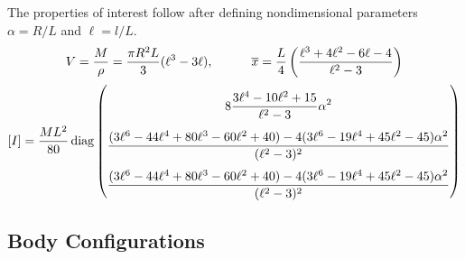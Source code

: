 \documentclass[11pt,dvipsnames]{thesis}
\begin{document}
The properties of interest follow after defining nondimensional parameters $\alpha = R/L$ and $\ell = l/L$.
\begin{gather}
V = \frac{M}{\rho} = \frac{\pi R^2 L}{3} (\ell^3 - 3\ell), \qquad\quad \overline{x} = \frac{L}{4} \left(\frac{\ell^3 + 4\ell^2 -6\ell - 4}{\ell^2 - 3}\right) \\
[I] = \frac{M L^2}{80} \operatorname{diag}
\renewcommand\arraystretch{2.6}
\begin{pmatrix}
\displaystyle 8 \frac{3\ell^4 - 10\ell^2 + 15}{\ell^2 - 3} \alpha^2 \\
\displaystyle \frac{(3\ell^6 - 44\ell^4 + 80\ell^3 - 60\ell^2 + 40) - 4(3\ell^6 - 19\ell^4 + 45\ell^2 - 45)\alpha^2}{(\ell^2 - 3)^2} \\ 
\displaystyle \frac{(3\ell^6 - 44\ell^4 + 80\ell^3 - 60\ell^2 + 40) - 4(3\ell^6 - 19\ell^4 + 45\ell^2 - 45)\alpha^2}{(\ell^2 - 3)^2}
\end{pmatrix}
\end{gather}

\subsection{Body Configurations} \label{subsec:StructuresBodyConfigs}
\end{document}
